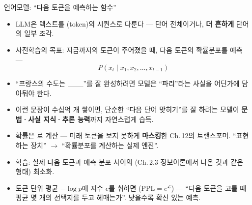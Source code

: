 \documentclass[aspectratio=169,11pt]{beamer}
\begin{document}
\begin{frame}{언어모델: ``다음 토큰을 예측하는 함수''}
  \begin{itemize}
    \item LLM은 텍스트를 (token)의 시퀀스로 다룬다 —
      단어 전체이거나, \textbf{더 흔하게} 단어의 일부 조각.
    \item 사전학습의 목표: 지금까지의 토큰이 주어졌을 때,
      다음 토큰의 확률분포를 예측 ---
      \[P(x_t \mid x_1, x_2, \ldots, x_{t-1})\]
    \item ``프랑스의 수도는 \_\_\_''를 잘 완성하려면 모델은
      ``파리''라는 사실을 어딘가에 담아둬야 한다.
    \item 이런 문장이 수십억 개 쌓이면, 단순한 ``다음 단어
      맞히기''를 잘 하려는 모델이 \textbf{문법·사실 지식·추론
      능력}까지 자연스럽게 습득.
    \item 확률은 로 계산 — 미래
      토큰을 보지 못하게 \textbf{마스킹}한 Ch.\,12의 트랜스포머.
      ``표현하는 장치'' $\to$ ``확률분포를 계산하는 실제 엔진''.
    \item 학습: 실제 다음 토큰과 예측 분포 사이의
      (Ch.\,2.3 정보이론에서 나온 것과
      같은 형태) 최소화.
    \item 토큰 단위 평균 $-\log p$에 지수 $e$를 취하면
      ($\text{PPL} = e^{\mathcal{L}}$) — ``다음
      토큰을 고를 때 평균 몇 개의 선택지를 두고 헤매는가''.
      낮을수록 확신 있는 예측.
  \end{itemize}
\end{frame}

\end{document}
